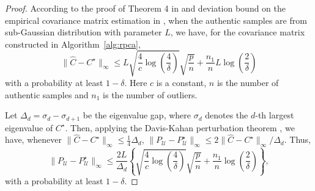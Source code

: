 \documentclass[11pt]{article}
\begin{document}
\begin{proof}
	According to the proof of Theorem 4 in \cite{chen2013robust} and deviation bound on the empirical covariance matrix estimation in \cite{vershynin2012close}, when the authentic samples are from sub-Gaussian distribution with parameter $ L $,  we have, for the covariance matrix constructed in Algorithm~\ref{alg:rpca},
	\begin{equation*}
	\|\widehat{C}-C^\star\|_\infty \leq L \sqrt{\frac{4}{c} \log(\frac{4}{\delta})}\sqrt{\frac{p}{n} } +  \frac{n_1}{n}L \log (\frac{2}{\delta}) 
	\end{equation*}
	with a probability at least $ 1-\delta $. Here $ c $ is a constant, $n$ is the number of authentic samples and $n_1$ is the number of outliers.
	
	Let $\Delta_d = \sigma_d - \sigma_{d+1}$ be the eigenvalue gap, where $\sigma_d$ denotes the $d$-th largest eigenvalue of $C^\star$.
	Then, applying the Davis-Kahan perturbation theorem \cite{davis1970rotation}, we have, whenever $\|\widehat{C}-C^\star\|_\infty \leq \frac{1}{4}\Delta_d$, $\|P_\mathcal{U}-P_\mathcal{U}^\star\|_\infty \leq {2\|\widehat{C}-C^\star\|_\infty}/{\Delta_d}$. Thus,
	\begin{equation*}
	\label{eqn:bounded_proj}
	 \|P_\mathcal{U}-P_\mathcal{U}^\star\|_\infty  \leq \frac{2L}{\Delta_d} \left\{ \sqrt{\frac{4}{c} \log(\frac{4}{\delta})}\sqrt{\frac{p}{n} } +  \frac{n_1}{n} \log (\frac{2}{\delta}) \right\},
	\end{equation*}
	with a probability at least $ 1-\delta $.
	
	
	
	

\end{proof}
\end{document}
